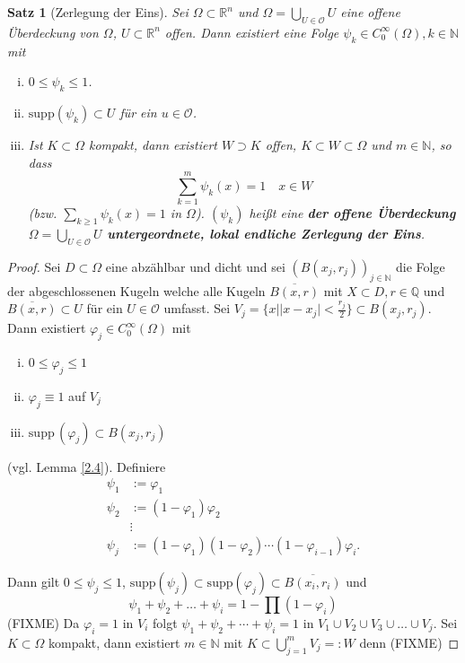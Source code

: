 \documentclass[
paper=a4,
bibtotocnumbered,
liststotocnumbered,
tablecaptionabove,
pointlessnumbers,
twoside,
openright,
10pt
]
{report}
\newcommand{\supp}{\mathrm{supp}\,}
\let\phi\varphi
\newtheorem{satz}[thm]{Satz}
\theoremstyle{definition}
\numberwithin{equation}{chapter}
\begin{document}
\begin{satz}[Zerlegung der Eins]
Sei $\Omega \subset \mathbb R^n$ und $\Omega = \bigcup_{U\in \mathcal O} U$ eine offene Überdeckung von $\Omega$, $U\subset \mathbb R^n$ offen. Dann existiert eine Folge $\psi_k \in C_0^\infty(\Omega), k \in \mathbb N$ mit
\begin{enumerate}[(i)]
\item $0 \le \psi_k\le 1$.
\item $\text{supp}(\psi_k) \subset U$ für ein $u\in \mathcal O$.
\item Ist $K\subset \Omega$ kompakt, dann existiert $W\supset K$ offen, $K\subset W\subset \Omega$ und $m\in \mathbb N$, so dass
$$
\sum_{k=1}^m \psi_k(x) =1 \quad x\in W
$$
(bzw. $\sum_{k\ge 1} \psi_k(x) =1$ in $\Omega$).  $(\psi_k)$ heißt eine \textbf{der offene Überdeckung $\Omega = \bigcup_{U\in \mathcal O} U$ untergeordnete, lokal endliche Zerlegung der Eins}.
\end{enumerate} 
\end{satz}
\begin{proof}
Sei $D\subset \Omega$ eine abzählbar und dicht und sei $(B(x_j, r_j))_{j\in \mathbb N}$ die Folge der abgeschlossenen Kugeln welche alle Kugeln $\overline{B(x, r)}$ mit $X\subset D, r\in \mathbb Q$ und $\overline{B(x,r)}\subset U$ für ein $U\in \mathcal O$ umfasst.
Sei $V_j= \{x||x-x_j|<\frac{r_j}{2}\} \subset B(x_j, r_j)$.  Dann existiert $\phi_j \in C_0^\infty(\Omega)$ mit
\begin{enumerate}[(i)]
\item $0\le \phi_j \le 1$
\item $\phi_j \equiv 1$ auf $V_j$
\item $\supp(\phi_j) \subset B(x_j, r_j)$
\end{enumerate}
(vgl. Lemma \ref{2.4}). Definiere
\begin{align*}
\psi_1&:= \phi_1 \\
\psi_2 &:= (1-\phi_1) \phi_2\\
&\vdots \\
\psi_j &:= (1-\phi_1)(1-\phi_2) \cdots (1- \phi_{i-1}) \phi_i.
\end{align*}

Dann gilt $0 \le \psi_j \le 1$, $\text{supp}(\psi_j) \subset \text{supp}(\phi_j) \subset \overline{B(x_i, r_i)}$ und
$$
\psi_1 + \psi_2 + \ldots + \psi_i = 1- \prod (1-\phi_i)
$$
(FIXME)
Da $\phi_i =1$ in $V_i$ folgt $\psi_1 + \psi_2 + \cdots + \psi_i =1$ in $V_1 \cup V_2 \cup V_3 \cup \ldots \cup V_j$. Sei $K\subset \Omega$ kompakt, dann existiert $m\in \mathbb N$ mit $K\subset \bigcup_{j=1}^m V_j =:W $ denn
(FIXME)
\end{proof}
\end{document}
